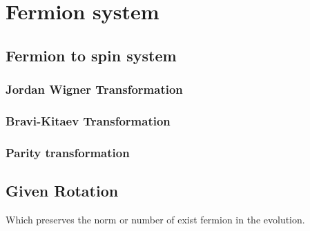 \chapter{Fermion system}


\section{Fermion to spin system}

\subsection{Jordan Wigner Transformation}

\subsection{Bravi-Kitaev Transformation}

\subsection{Parity transformation}

\section{Given Rotation}

Which preserves the norm or number of exist fermion 
in the evolution.